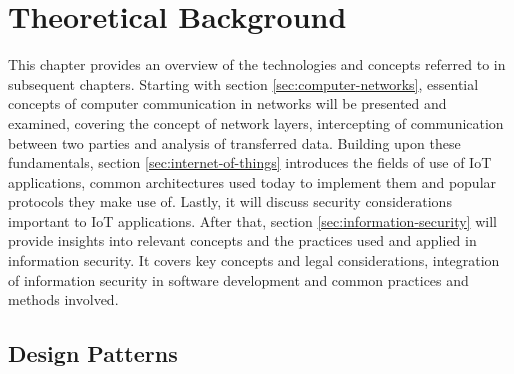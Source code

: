 \chapter{Theoretical Background}
\label{chap:theoretical-background}
This chapter provides an overview of the technologies and concepts referred to in subsequent chapters.
Starting with section \ref{sec:computer-networks}, essential concepts of computer communication in networks will be presented and examined, covering the concept of network layers, intercepting of communication between two parties and analysis of transferred data.
Building upon these fundamentals, section \ref{sec:internet-of-things} introduces the fields of use of \ac{IoT} applications, common architectures used today to implement them and popular protocols they make use of. Lastly, it will discuss security considerations important to \ac{IoT} applications.
After that, section \ref{sec:information-security} will provide insights into relevant concepts and the practices used and applied in information security. It covers key concepts and legal considerations, integration of information security in software development and common practices and methods involved.


\section{Design Patterns}
